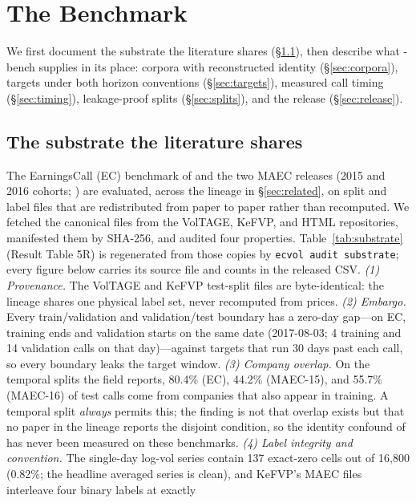 \section{The \ecvol{} Benchmark}
\label{sec:benchmark}

We first document the substrate the literature shares (\S\ref{sec:substrate}), then
describe what \ecvol-bench supplies in its place: corpora with reconstructed
identity (\S\ref{sec:corpora}), targets under both horizon conventions
(\S\ref{sec:targets}), measured call timing (\S\ref{sec:timing}), leakage-proof
splits (\S\ref{sec:splits}), and the release (\S\ref{sec:release}).

\subsection{The substrate the literature shares}
\label{sec:substrate}
The EarningsCall (EC) benchmark of \citet{qin2019what} and the two MAEC releases
(2015 and 2016 cohorts; \citealp{li2020maec}) are evaluated, across the lineage in
\S\ref{sec:related}, on split and label files that are redistributed from paper to
paper rather than recomputed. We fetched the canonical files from the VolTAGE, KeFVP,
and HTML repositories, manifested them by SHA-256, and audited four properties.
Table~\ref{tab:substrate} (Result Table 5R) is regenerated from those copies by
\texttt{ecvol audit substrate}; every figure below carries its source file and counts
in the released CSV.
\emph{(1) Provenance.} The VolTAGE and KeFVP test-split files are byte-identical:
the lineage shares one physical label set, never recomputed from prices.
\emph{(2) Embargo.} Every train/validation and validation/test boundary has a
zero-day gap---on EC, training ends and validation starts on the same date
(2017-08-03; 4 training and 14 validation calls on that day)---against targets that
run 30 days past each call, so every boundary leaks the target window.
\emph{(3) Company overlap.} On the temporal splits the field reports, 80.4\% (EC),
44.2\% (MAEC-15), and 55.7\% (MAEC-16) of test calls come from companies that also
appear in training. A temporal split \emph{always} permits this; the finding is not
that overlap exists but that no paper in the lineage reports the disjoint
condition, so the identity confound of \citet{scss2024} has never been measured on
these benchmarks. \emph{(4) Label integrity and convention.} The single-day log-vol
series contain 137 exact-zero cells out of 16{,}800 (0.82\%; the headline averaged
series is clean), and KeFVP's MAEC files interleave four binary labels at exactly
